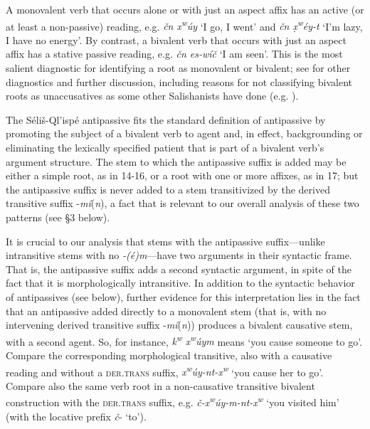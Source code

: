 \documentclass[output=paper,colorlinks,citecolor=brown]{langscibook}
\begin{document}
A monovalent verb that occurs alone or with just an aspect affix has
an active (or at least a non-passive) reading, e.g. \emph{\v{c}n
 x\textsuperscript w\'uy} `I go, I went' and \emph{\v{c}n
 \d{x}\textsuperscript w\'ey-t} `I'm lazy, I have no energy'.  By
contrast, a bivalent verb that occurs with just an aspect affix has a
stative passive reading, e.g. \emph{\v{c}n es-w\'i\v{c}} `I am seen'.
This is the most salient diagnostic for identifying a root as
monovalent or bivalent; see \cite{S.Thomasonetal.:1994} for other diagnostics
and further discussion, including reasons for not classifying bivalent
roots as unaccusatives as some other Salishanists have done
(e.g. \cite{Gerdts:1991}).


The S\'eli\v{s}-Ql'isp\'e antipassive fits the standard definition of
antipassive by promoting the subject of a bivalent verb to agent and,
in effect, backgrounding or eliminating the lexically specified
patient that is part of a bivalent verb's argument structure.  The
stem to which the antipassive suffix is added may be either a simple
root, as in 14-16, or a root with one or more affixes, as in 17; but
the antipassive suffix is never added to a stem transitivized by the
derived transitive suffix -\emph{m\'i}(\emph{n}), a fact that is
relevant to our overall analysis of these two patterns (see \S 3
below).


It is crucial to our analysis that stems with the antipassive
suffix---unlike intransitive stems with no \emph{-(\'e)m}---have two
arguments in their syntactic frame.  That is, the antipassive suffix
adds a second syntactic argument, in spite of the fact that it is
morphologically intransitive.  In addition to the syntactic behavior
of antipassives (see below), further evidence for this interpretation
lies in the fact that an antipassive added directly to a monovalent
stem (that is, with no intervening derived transitive suffix -\emph{m\'i}(\emph{n})) produces a bivalent causative stem, with a second
agent.  So, for instance, \emph{{k\textsuperscript w} x\textsuperscript
 w\'uym} means `you cause someone to go'.  Compare the corresponding
morphological transitive, also with a causative reading and without a
\textsc{der.trans} suffix, \emph{x\textsuperscript
 w\'uy-nt-x\textsuperscript w} `you cause her to go'.  Compare also the
same verb root in a non-causative transitive bivalent construction
with the \textsc{der.trans} suffix, e.g. \emph{\v{c}-x\textsuperscript
 w\'uy-m-nt-x\textsuperscript w} `you visited him' (with the locative
prefix \emph{\v{c}}- `to').
\end{document}
